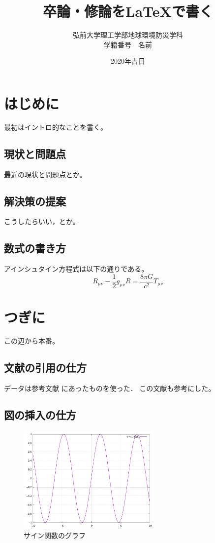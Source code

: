 \documentclass[a4paper,12pt]{jsreport}
\title{卒論・修論を\LaTeX で書く}
\author{弘前大学理工学部地球環境防災学科\\
学籍番号　名前}
\date{2020年吉日}
\begin{document}
\maketitle
\tableofcontents

\chapter{はじめに}

最初はイントロ的なことを書く。
\section{現状と問題点}

最近の現状と問題点とか。

\section{解決策の提案}

こうしたらいい，とか。

\section{数式の書き方}

アインシュタイン方程式は以下の通りである。
\begin{equation}
    R_{\mu\nu} - \frac{1}{2} g_{\mu\nu} R = 
    \frac{8\pi G}{c^2} T_{\mu\nu}
\end{equation}



\chapter{つぎに}

この辺から本番。

\section{文献の引用の仕方} 

データは参考文献\cite{rika} にあったものを使った．
この文献\cite{ten}も参考にした。

\section{図の挿入の仕方}
\begin{figure}[h]
  \begin{center}
    \includegraphics[width=7cm]{./plot1.pdf}
    \caption{サイン関数のグラフ}
  \end{center}
\end{figure}
\end{document}
